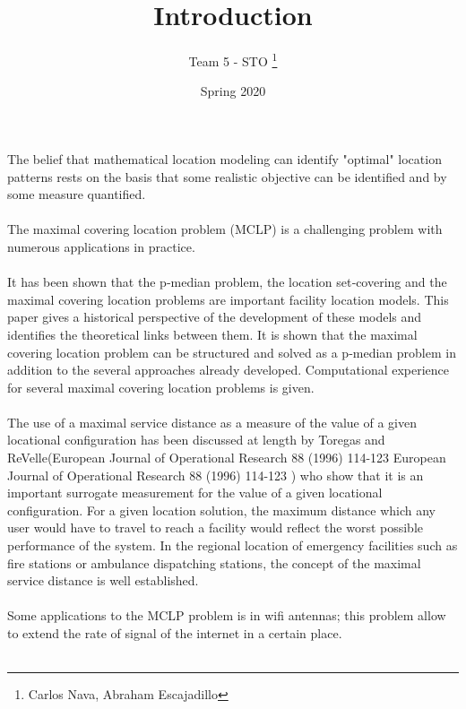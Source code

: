 \documentclass[12pt,a4paper,twoside]{article}
\title{Introduction}
\author{Team 5 - STO \thanks {Carlos Nava, Abraham Escajadillo}}
\date{Spring 2020}
\begin{document}
\maketitle

The belief that mathematical location modeling can identify "optimal" location patterns rests on the basis that some realistic objective can be identified and by some measure quantified.\\\\
The maximal covering location problem (MCLP) is a challenging problem with numerous applications in practice.\\\\
It has been shown that the p‐median problem, the location set‐covering and the maximal covering location problems are important facility location models. This paper gives  a  historical  perspective  of  the development of these models and identifies the theoretical links between them. It is shown that the 
maximal covering location problem can be structured and solved as a p‐median problem in addition to the several approaches already developed. Computational experience for several maximal covering location problems is given.\\\\
The use of a maximal service distance as a measure of the value of a given locational configuration has been discussed at length by Toregas and ReVelle(European Journal of Operational Research 88 (1996) 114-123 European Journal of Operational Research 88 (1996) 114-123 ) who show that it is an important surrogate measurement for the value of a given locational configuration. For a given location solution, the maximum distance which any user would have to travel to reach a facility would reflect the worst possible performance of the system. In the regional location of emergency facilities such as fire stations or ambulance dispatching stations, the concept of the maximal service distance is well established.\\\\
Some applications to the MCLP problem is in wifi antennas; this problem allow to extend the rate of signal of the internet in a certain place.\\\\
\end{document}
